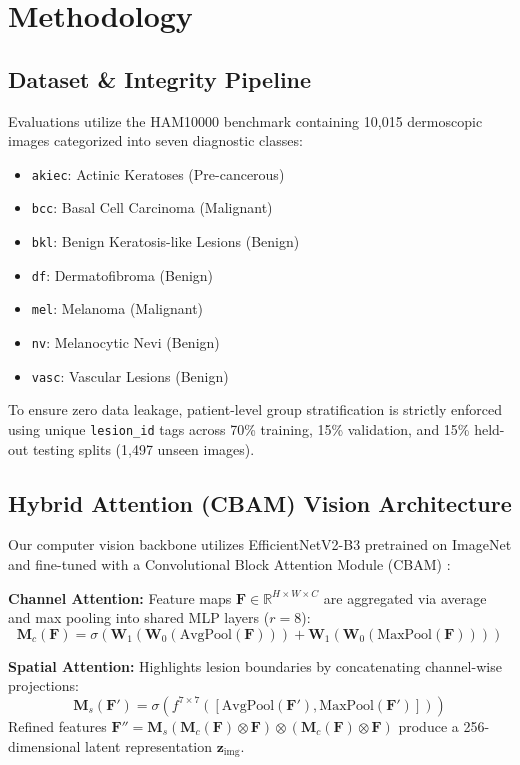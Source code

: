 ﻿\documentclass[conference]{IEEEtran}
\begin{document}
\section{Methodology}

\subsection{Dataset \& Integrity Pipeline}
Evaluations utilize the HAM10000 benchmark containing 10,015 dermoscopic images categorized into seven diagnostic classes:
\begin{itemize}
    \item \texttt{akiec}: Actinic Keratoses (Pre-cancerous)
    \item \texttt{bcc}: Basal Cell Carcinoma (Malignant)
    \item \texttt{bkl}: Benign Keratosis-like Lesions (Benign)
    \item \texttt{df}: Dermatofibroma (Benign)
    \item \texttt{mel}: Melanoma (Malignant)
    \item \texttt{nv}: Melanocytic Nevi (Benign)
    \item \texttt{vasc}: Vascular Lesions (Benign)
\end{itemize}
To ensure zero data leakage, patient-level group stratification is strictly enforced using unique \texttt{lesion\_id} tags across 70\% training, 15\% validation, and 15\% held-out testing splits (1,497 unseen images).

\subsection{Hybrid Attention (CBAM) Vision Architecture}
Our computer vision backbone utilizes EfficientNetV2-B3 pretrained on ImageNet and fine-tuned with a Convolutional Block Attention Module (CBAM) \cite{woo2018cbam}:

\textbf{Channel Attention:} Feature maps $\mathbf{F} \in \mathbb{R}^{H \times W \times C}$ are aggregated via average and max pooling into shared MLP layers ($r=8$):
\begin{equation}
\mathbf{M}_c(\mathbf{F}) = \sigma\left(\mathbf{W}_1(\mathbf{W}_0(\text{AvgPool}(\mathbf{F}))) + \mathbf{W}_1(\mathbf{W}_0(\text{MaxPool}(\mathbf{F})))\right)
\end{equation}

\textbf{Spatial Attention:} Highlights lesion boundaries by concatenating channel-wise projections:
\begin{equation}
\mathbf{M}_s(\mathbf{F}') = \sigma\left(f^{7 \times 7}([\text{AvgPool}(\mathbf{F}'), \text{MaxPool}(\mathbf{F}')])\right)
\end{equation}
Refined features $\mathbf{F}'' = \mathbf{M}_s(\mathbf{M}_c(\mathbf{F}) \otimes \mathbf{F}) \otimes (\mathbf{M}_c(\mathbf{F}) \otimes \mathbf{F})$ produce a 256-dimensional latent representation $\mathbf{z}_{\text{img}}$.
\end{document}

